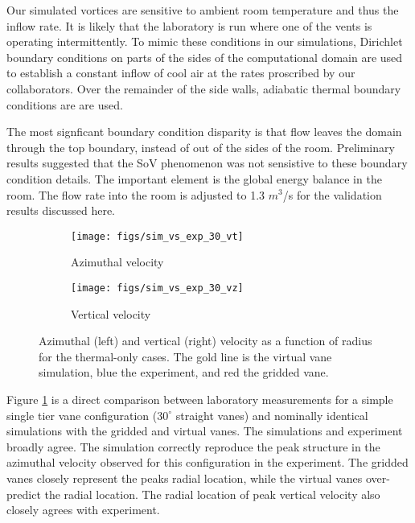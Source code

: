 Our simulated vortices are sensitive to ambient room temperature and thus 
the inflow rate. It is likely that the laboratory is run where one of
the vents is operating intermittently. 
To mimic these conditions in our simulations, Dirichlet boundary conditions 
on parts of the sides of the computational domain are used to
establish a constant inflow of cool air at the rates 
proscribed by our collaborators. Over the remainder of the side walls, 
adiabatic thermal boundary conditions are are used. 

The most signficant boundary condition disparity is that flow leaves the
domain through the top boundary, instead of out of the sides of the
room. Preliminary results suggested that the SoV phenomenon  was not
sensistive to these boundary condition details. The important element is
the  global energy balance in the room. The flow rate into the room is
adjusted to  1.3 $m^3$/s for the validation results discussed here.  


\begin{figure}[htp!]

 \begin{subfigure}{.5\textwidth}
  \centering
  \texttt{[image: figs/sim\_vs\_exp\_30\_vt]}
  \caption{Azimuthal velocity}
 \end{subfigure}%
 \begin{subfigure}{.5\textwidth}
  \centering
  \texttt{[image: figs/sim\_vs\_exp\_30\_vz]}%
  \caption{Vertical velocity} 
 \end{subfigure}%
  \caption{Azimuthal (left) and vertical (right) velocity 
 as a function of radius for the thermal-only cases. The gold line is
 the virtual vane simulation, blue the experiment, and red the gridded vane.} 
  \label{fig:val_lab}  
\end{figure}

Figure \ref{fig:val_lab} is a direct comparison between laboratory 
measurements for a simple single tier vane configuration ($30^{\circ}$
straight vanes) and nominally identical simulations with the gridded and
virtual vanes. The simulations and experiment broadly agree. The
simulation correctly reproduce the peak structure in the azimuthal
velocity observed for this configuration in the experiment. The gridded
vanes closely represent the peaks radial location, while the
virtual vanes over-predict the radial location. The radial location of
peak vertical velocity also closely agrees with experiment.

